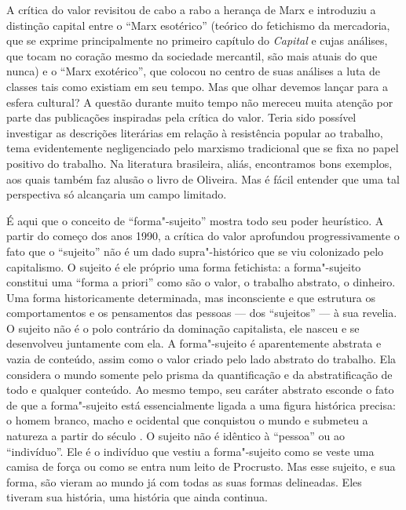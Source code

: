 A crítica do valor revisitou de cabo a rabo a herança de Marx e
introduziu a distinção capital entre o ``Marx esotérico'' (teórico do
fetichismo da mercadoria, que se exprime principalmente no primeiro
capítulo do \emph{Capital} e cujas análises, que tocam no coração mesmo
da sociedade mercantil, são mais atuais do que nunca) e o ``Marx
exotérico'', que colocou no centro de suas análises a luta de classes
tais como existiam em seu tempo. Mas que olhar devemos lançar para a
esfera cultural? A questão durante muito tempo não mereceu muita atenção
por parte das publicações inspiradas pela crítica do valor. Teria sido
possível investigar as descrições literárias em relação à resistência
popular ao trabalho, tema evidentemente negligenciado pelo marxismo
tradicional que se fixa no papel positivo do trabalho. Na literatura
brasileira, aliás, encontramos bons exemplos, aos quais também faz
alusão o livro de Oliveira. Mas é fácil entender que uma tal perspectiva
só alcançaria um campo limitado.

É aqui que o conceito de ``forma"-sujeito'' mostra todo seu poder
heurístico. A partir do começo dos anos 1990, a crítica do valor
aprofundou progressivamente o fato que o ``sujeito'' não é um dado
supra"-histórico que se viu colonizado pelo capitalismo. O sujeito é ele
próprio uma forma fetichista: a forma"-sujeito constitui uma ``forma a
priori'' como são o valor, o trabalho abstrato, o dinheiro. Uma forma
historicamente determinada, mas inconsciente e que estrutura os
comportamentos e os pensamentos das pessoas --- dos ``sujeitos'' --- à sua
revelia. O sujeito não é o polo contrário da dominação capitalista, ele
nasceu e se desenvolveu juntamente com ela. A forma"-sujeito é
aparentemente abstrata e vazia de conteúdo, assim como o valor criado pelo
lado abstrato do trabalho. Ela considera o mundo somente pelo prisma da
quantificação e da abstratificação de todo e qualquer conteúdo. Ao mesmo
tempo, seu caráter abstrato esconde o fato de que a forma"-sujeito está
essencialmente ligada a uma figura histórica precisa: o homem branco,
macho e ocidental que conquistou o mundo e submeteu a natureza a partir
do século . O sujeito não é idêntico à ``pessoa'' ou ao ``indivíduo''.
Ele é o indivíduo que vestiu a forma"-sujeito como se veste uma camisa de
força ou como se entra num leito de Procrusto. Mas esse sujeito, e sua
forma, são vieram ao mundo já com todas as suas formas delineadas. Eles
tiveram sua história, uma história que ainda continua.


